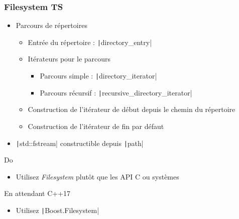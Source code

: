 \documentclass[C++.tex]{subfiles}
\begin{document}
\begin{frame}[fragile]
	\frametitle{Filesystem TS}
	\begin{itemize}
		\item Parcours de répertoires
		\begin{itemize}
			\item Entrée du répertoire : \texttt|directory_entry|
			\item Itérateurs pour le parcours
			\begin{itemize}
				\item Parcours simple : \texttt|directory_iterator|
				\item Parcours récursif : \texttt|recursive_directory_iterator|
			\end{itemize}
			\item Construction de l'itérateur de début depuis le chemin du répertoire
			\item Construction de l'itérateur de fin par défaut
		\end{itemize}
		\item \texttt|std::fstream| constructible depuis \texttt|path|
	\end{itemize}

	\begin{exampleblock}{Do}
		\begin{itemize}
			\item Utilisez \textit{Filesystem} plutôt que les API C ou systèmes
		\end{itemize}
	\end{exampleblock}

	\begin{block}{En attendant C++17}
		\begin{itemize}
			\item Utilisez \texttt|Boost.Filesystem|
		\end{itemize}
	\end{block}
\end{frame}
\end{document}
